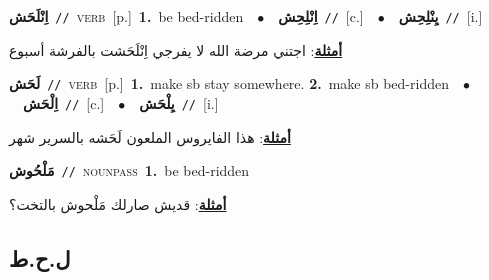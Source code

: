 \documentclass[10pt,a4paper,twoside]{article} %
\begin{document}
\begin{multicols}{2}
{\setlength\topsep{0pt}\textbf{\foreignlanguage{arabic}{اِنْلَحَش}}\ {\color{gray}\texttt{//}\color{black}}\ \textsc{verb}\ [p.]\ \textbf{1.}~be bed-ridden\ \ $\bullet$\ \ \setlength\topsep{0pt}\textbf{\foreignlanguage{arabic}{اِنْلِحِش}}\ {\color{gray}\texttt{//}\color{black}}\ [c.]\ \ $\bullet$\ \ \setlength\topsep{0pt}\textbf{\foreignlanguage{arabic}{يِنْلِحِش}}\ {\color{gray}\texttt{//}\color{black}}\ [i.]\  \begin{flushright}\color{gray}\foreignlanguage{arabic}{\textbf{\underline{\foreignlanguage{arabic}{أمثلة}}}: اجتني مرضة الله لا يفرجي اِنْلَحَشت بالفرشة أسبوع}\end{flushright}\color{black}} \vspace{2mm}

{\setlength\topsep{0pt}\textbf{\foreignlanguage{arabic}{لَحَش}}\ {\color{gray}\texttt{//}\color{black}}\ \textsc{verb}\ [p.]\ \textbf{1.}~make sb stay somewhere.  \textbf{2.}~make sb bed-ridden\ \ $\bullet$\ \ \setlength\topsep{0pt}\textbf{\foreignlanguage{arabic}{اِلْحَش}}\ {\color{gray}\texttt{//}\color{black}}\ [c.]\ \ $\bullet$\ \ \setlength\topsep{0pt}\textbf{\foreignlanguage{arabic}{يِلْحَش}}\ {\color{gray}\texttt{//}\color{black}}\ [i.]\  \begin{flushright}\color{gray}\foreignlanguage{arabic}{\textbf{\underline{\foreignlanguage{arabic}{أمثلة}}}: هذا الفايروس الملعون لَحَشه بالسرير شهر}\end{flushright}\color{black}} \vspace{2mm}

{\setlength\topsep{0pt}\textbf{\foreignlanguage{arabic}{مَلْحُوش}}\ {\color{gray}\texttt{//}\color{black}}\ \textsc{noun\textunderscore pass}\ \textbf{1.}~be bed-ridden\  \begin{flushright}\color{gray}\foreignlanguage{arabic}{\textbf{\underline{\foreignlanguage{arabic}{أمثلة}}}: قديش صارلك مَلْحوش بالتخت؟}\end{flushright}\color{black}} \vspace{2mm}

\vspace{-3mm}
\subsection*{\color{blue}\foreignlanguage{arabic}{ل.ح.ط}\color{blue}{}} 


\end{multicols}
\end{document}
